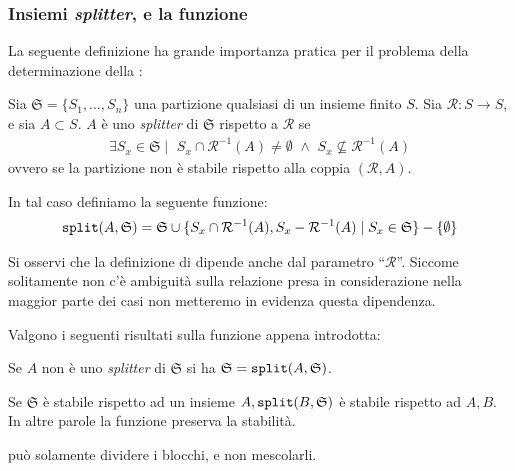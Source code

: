 \subsubsection{Insiemi \emph{splitter}, e la funzione \splitfunc}
La seguente definizione ha grande importanza pratica per il problema della determinazione della \rscp:
\begin{definition}
    \label{def:funz_split}
    Sia $\mathfrak{S} = \{S_1,\dots,S_n\}$ una partizione qualsiasi di un insieme finito $S$. Sia $\mathcal{R}: S \to S$, e sia $A \subset S$. $A$ è uno \emph{splitter} di $\mathfrak{S}$ rispetto a $\mathcal{R}$ se
    \begin{gather*}
        \exists S_x \in \mathfrak{S} \mid \,\, S_x \cap \mathcal{R}^{-1}(A) \neq \emptyset \,\,\land\,\, S_x \not\subseteq \mathcal{R}^{-1}(A)
    \end{gather*}
    ovvero se la partizione non è stabile rispetto alla coppia $(\mathcal{R},A)$.

    In tal caso definiamo la seguente funzione:
    \begin{gather*}
        \texttt{\textup{split}}(A,\mathfrak{S}) = \mathfrak{S} \cup \{S_x \cap \mathcal{R}^{-1}(A), S_x - \mathcal{R}^{-1}(A) \mid S_x \in \mathfrak{S}\} - \{\emptyset\}
    \end{gather*}

    Si osservi che la definizione di \splitfunc dipende anche dal parametro ``$\mathcal{R}$''. Siccome solitamente non c'è ambiguità sulla relazione presa in considerazione nella maggior parte dei casi non metteremo in evidenza questa dipendenza.
\end{definition}

Valgono i seguenti risultati sulla funzione \splitfunc appena introdotta:
\begin{observation}
    Se $A$ non è uno \emph{splitter} di $\mathfrak{S}$ si ha $\mathfrak{S} = \texttt{\textup{split}}(A,\mathfrak{S})$.
\end{observation}

\begin{proposition}
    \label{prop:split_eredita}
    Se $\mathfrak{S}$ è stabile rispetto ad un insieme $A, \texttt{\textup{split}}(B,\mathfrak{S})$ è stabile rispetto ad $A,B$. In altre parole la funzione \splitfunc preserva la stabilità.
\end{proposition}
\begin{proof2}
    \splitfunc può solamente dividere i blocchi, e non mescolarli.
\end{proof2}


